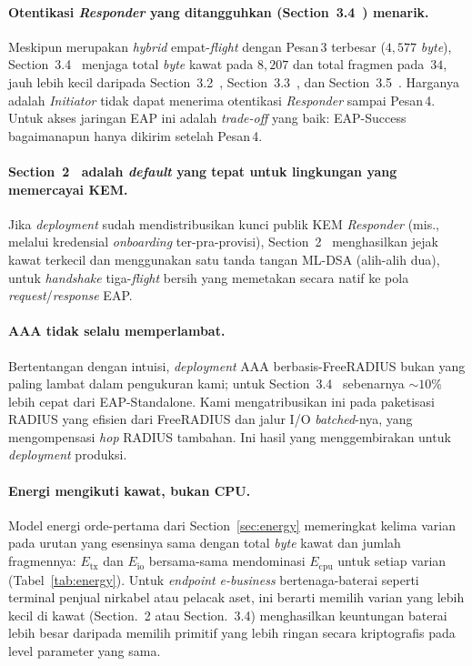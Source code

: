\documentclass{easychair}
\newcommand{\VarSec}[1]{Section~#1~\cite{pq-edhoc-draft}}
\newcommand{\VarSecShort}[1]{Section.~#1}
\begin{document}
\paragraph{Otentikasi \emph{Responder} yang ditangguhkan (\texorpdfstring{\VarSec{3.4}}{Section 3.4}) menarik.}
Meskipun merupakan \emph{hybrid} empat-\emph{flight} dengan Pesan\,3
terbesar ($4{,}577$ \emph{byte}), \VarSec{3.4} menjaga total \emph{byte}
kawat pada $8{,}207$ dan total fragmen pada~$34$, jauh lebih kecil
daripada \VarSec{3.2}, \VarSec{3.3}, dan \VarSec{3.5}. Harganya adalah
\emph{Initiator} tidak dapat menerima otentikasi \emph{Responder}
sampai Pesan\,4. Untuk akses jaringan EAP ini adalah \emph{trade-off}
yang baik: EAP-Success bagaimanapun hanya dikirim setelah Pesan\,4.

\paragraph{\texorpdfstring{\VarSec{2}}{Section 2} adalah \emph{default} yang tepat untuk lingkungan yang memercayai KEM.}
Jika \emph{deployment} sudah mendistribusikan kunci publik KEM
\emph{Responder} (mis., melalui kredensial \emph{onboarding}
ter-pra-provisi), \VarSec{2} menghasilkan jejak kawat terkecil dan
menggunakan satu tanda tangan ML-DSA (alih-alih dua), untuk
\emph{handshake} tiga-\emph{flight} bersih yang memetakan secara
natif ke pola \emph{request}/\emph{response} EAP.

\paragraph{AAA tidak selalu memperlambat.}
Bertentangan dengan intuisi, \emph{deployment} AAA berbasis-FreeRADIUS
bukan yang paling lambat dalam pengukuran kami; untuk \VarSec{3.4}
sebenarnya $\sim\!10\%$ lebih cepat dari EAP-Standalone. Kami
mengatribusikan ini pada paketisasi RADIUS yang efisien dari
FreeRADIUS dan jalur I/O \emph{batched}-nya, yang mengompensasi
\emph{hop} RADIUS tambahan. Ini hasil yang menggembirakan untuk
\emph{deployment} produksi.

\paragraph{Energi mengikuti kawat, bukan CPU.}
Model energi orde-pertama dari Section~\ref{sec:energy} memeringkat
kelima varian pada urutan yang esensinya sama dengan total \emph{byte}
kawat dan jumlah fragmennya: $E_{\mathrm{tx}}$ dan $E_{\mathrm{io}}$
bersama-sama mendominasi $E_{\mathrm{cpu}}$ untuk setiap varian
(Tabel~\ref{tab:energy}). Untuk \emph{endpoint} \emph{e-business}
bertenaga-baterai seperti terminal penjual nirkabel atau pelacak aset,
ini berarti memilih varian yang lebih kecil di kawat (\VarSecShort{2}
atau \VarSecShort{3.4}) menghasilkan keuntungan baterai lebih besar
daripada memilih primitif yang lebih ringan secara kriptografis pada
level parameter yang sama.
\end{document}
